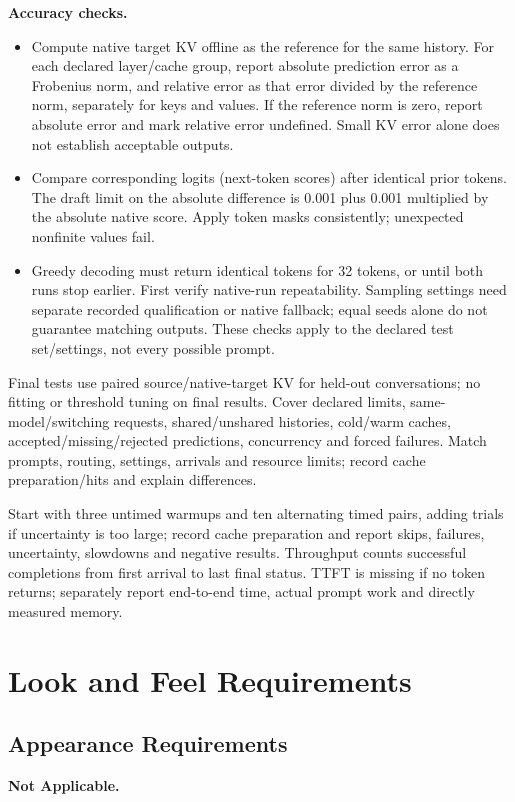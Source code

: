 \documentclass[12pt]{article}
\begin{document}
\textbf{Accuracy checks.}
\begin{itemize}
\item Compute native target KV offline as the reference for the same history.
For each declared layer/cache group, report absolute prediction error as a
Frobenius norm, and relative error as that error divided by the reference
norm, separately for keys and values. If the reference norm is zero, report
absolute error and mark relative error undefined. Small KV error alone does
not establish acceptable outputs.
\item Compare corresponding logits (next-token scores) after identical prior
tokens. The draft limit on the absolute difference is 0.001 plus
0.001 multiplied by the absolute native score. Apply token masks
consistently; unexpected nonfinite values fail.
\item Greedy decoding must return identical tokens for 32 tokens,
or until both runs stop earlier. First verify native-run repeatability.
Sampling settings need separate recorded qualification or native fallback;
equal seeds alone do not guarantee matching outputs.
These checks apply to the declared test set/settings, not every possible prompt.
\end{itemize}

Final tests use paired source/native-target KV for held-out conversations;
no fitting or threshold tuning on final results. Cover declared limits,
same-model/switching requests, shared/unshared histories, cold/warm caches,
accepted/missing/rejected predictions, concurrency and forced failures.
Match prompts, routing, settings, arrivals and resource limits; record cache
preparation/hits and explain differences.

Start with three untimed warmups and ten alternating timed pairs, adding
trials if uncertainty is too large; record cache preparation and report
skips, failures, uncertainty, slowdowns and negative results. Throughput counts
successful completions from first arrival to last final status. TTFT is
missing if no token returns; separately report end-to-end time, actual prompt
work and directly measured memory.

\section{Look and Feel Requirements}


\subsection{Appearance Requirements}
\textbf{Not Applicable.}
\end{document}
